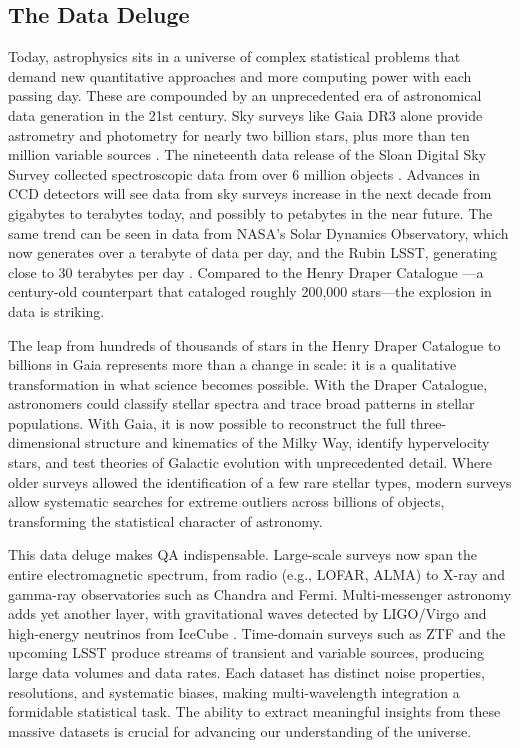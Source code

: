 \documentclass[preprint,longauthor]{aastex631}
\numberwithin{equation}{section}
\begin{document}
\subsection{The Data Deluge}

Today, astrophysics sits in a universe of complex statistical problems that demand new quantitative approaches and more computing power with each passing day. These are compounded by an unprecedented era of astronomical data generation in the 21st century. Sky surveys like Gaia DR3 alone provide astrometry and photometry for nearly two billion stars, plus more than ten million variable sources \citep{gaiacollaborationGaiaDataRelease2023}. The nineteenth data release of the Sloan Digital Sky Survey collected spectroscopic data from over 6 million objects \citep{sdsscollaborationNineteenthDataRelease2025}. Advances in CCD detectors will see data from sky surveys increase in the next decade from gigabytes to terabytes today, and possibly to petabytes in the near future. The same trend can be seen in data from NASA's Solar Dynamics Observatory, which now generates over a terabyte of data per day, and the Rubin LSST, generating close to 30 terabytes per day \citep{borneAstroinformatics21stCentury2009}. Compared to the Henry Draper Catalogue \citep{cannonHenryDraperCatalogue1918}—a century-old counterpart that cataloged roughly 200,000 stars—the explosion in data is striking.

The leap from hundreds of thousands of stars in the Henry Draper Catalogue to billions in Gaia represents more than a change in scale: it is a qualitative transformation in what science becomes possible. With the Draper Catalogue, astronomers could classify stellar spectra and trace broad patterns in stellar populations. With Gaia, it is now possible to reconstruct the full three-dimensional structure and kinematics of the Milky Way, identify hypervelocity stars, and test theories of Galactic evolution with unprecedented detail. Where older surveys allowed the identification of a few rare stellar types, modern surveys allow systematic searches for extreme outliers across billions of objects, transforming the statistical character of astronomy.

This data deluge makes QA indispensable. Large-scale surveys now span the entire electromagnetic spectrum, from radio (e.g., LOFAR, ALMA) to X-ray and gamma-ray observatories such as Chandra and Fermi. Multi-messenger astronomy adds yet another layer, with gravitational waves detected by LIGO/Virgo and high-energy neutrinos from IceCube \citep{abbasiSearchIceCubeSubTeV2023}. Time-domain surveys such as ZTF and the upcoming LSST produce streams of transient and variable sources, producing large data volumes and data rates. Each dataset has distinct noise properties, resolutions, and systematic biases, making multi-wavelength integration a formidable statistical task. The ability to extract meaningful insights from these massive datasets is crucial for advancing our understanding of the universe.
\end{document}

